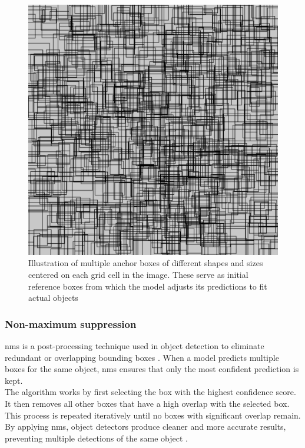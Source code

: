 \newpage


\begin{figure}[h!]
    \centering
    \includegraphics[width=0.7\linewidth]{figures/theory/image-recognition/anchor-boxes.png}
    \caption[Example of anchor boxes in object detection]{Illustration of multiple anchor boxes of different shapes and sizes centered on each grid cell in the image. These serve as initial reference boxes from which the model adjusts its predictions to fit actual objects
    \cite{thinkautonomous:anchorboxes}}
    \label{fig:anchor-box}
\end{figure}

\subsubsection*{Non-maximum suppression}
\gls{nms} is a post-processing technique used in object detection to eliminate redundant or overlapping bounding boxes . When a model predicts multiple boxes for the same object, \gls{nms} ensures that only the most confident prediction is kept. \\

The algorithm works by first selecting the box with the highest confidence score. It then removes all other boxes that have a high overlap with the selected box. This process is repeated iteratively until no boxes with significant overlap remain. By applying \gls{nms}, object detectors produce cleaner and more accurate results, preventing multiple detections of the same object
\cite{thepythoncode:nms}.

\newpage

